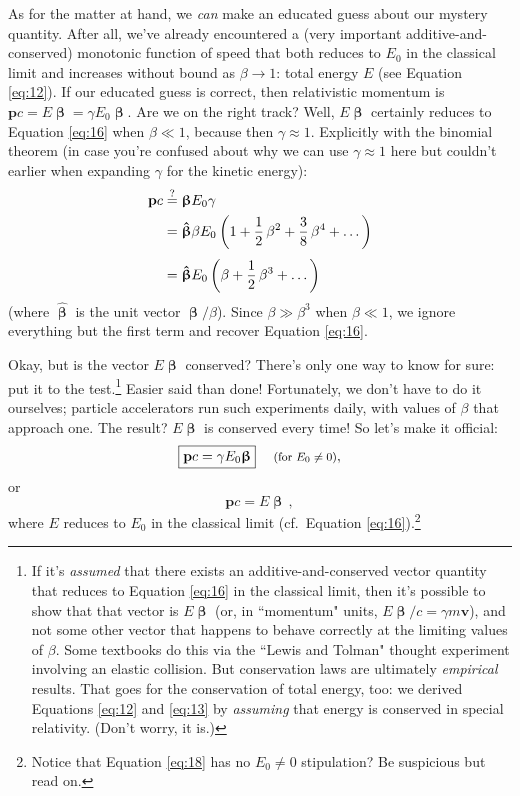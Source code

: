 \documentclass[12pt]{article}
\renewcommand{\vv}[1]{\mathbf{#1}}
\newcommand{\vvbeta}{\bm{\upbeta}}
\newcommand{\hatbeta}{\bm{\hat{\upbeta}}}
\begin{document}
As for the matter at hand, we \emph{can} make an educated guess about our mystery quantity. After all, we've already encountered a (very important additive-and-conserved) monotonic function of speed that both reduces to $E_0$ in the classical limit and increases without bound as $\beta \rightarrow 1$: total energy $E$ (see Equation \ref{eq:12}). If our educated guess is correct, then relativistic momentum is $\vv p c = E \vvbeta = \gamma E_0 \vvbeta$. Are we on the right track? Well, $E \vvbeta$ certainly reduces to Equation \ref{eq:16} when $\beta \ll 1$, because then $\gamma \approx 1$. Explicitly with the binomial theorem (in case you're confused about why we can use $\gamma \approx 1$ here but couldn't earlier when expanding $\gamma$ for the kinetic energy):
\begin{equation*}
\begin{split}
\vv p c &\stackrel{?}{=} \vvbeta E_0 \gamma \\
&=  \hatbeta \beta E_0 \mkern.5mu \left( 1 + \dfrac{1}{2} \, \beta ^2 +  \dfrac{3}{8} \, \beta ^4 + \dots \right) \\[3pt]
&=  \hatbeta E_0 \left( \beta + \dfrac{1}{2} \, \beta^3 + \dots \right)
\end{split}
\end{equation*}
(where $\hatbeta$ is the unit vector $\vvbeta / \beta$). Since $\beta \gg \beta^3$ when $\beta \ll 1$, we ignore everything but the first term and recover Equation \ref{eq:16}.

Okay, but is the vector $E \vvbeta$ conserved? There's only one way to know for sure: put it to the test.\footnote{If it's \emph{assumed} that there exists an additive-and-conserved vector quantity that reduces to Equation \ref{eq:16} in the classical limit, then it's possible to show that that vector is $E \vvbeta$ (or, in ``momentum" units, $E \vvbeta/c = \gamma m \vv v$), and not some other vector that happens to behave correctly at the limiting values of $\beta$. Some textbooks do this via the ``Lewis and Tolman" thought experiment involving an elastic collision. But conservation laws are ultimately \emph{empirical} results. That goes for the conservation of total energy, too: we derived Equations \ref{eq:12} and \ref{eq:13} by \emph{assuming} that energy is conserved in special relativity. (Don't worry, it is.)} Easier said than done! Fortunately, we don't have to do it ourselves; particle accelerators run such experiments daily, with values of $\beta$ that approach one. The result? $E \vvbeta$ is conserved every time! So let's make it official:
\begin{equation}\label{eq:17}
\boxed{\vv p c = \gamma E_0 \vvbeta}  \quad \textrm{\footnotesize{ (for $E_0 \neq 0$)}},
\end{equation}
or
\begin{equation}\label{eq:18}
\boxed{\vv p c = E \vvbeta} \, ,
\end{equation}
where $E$ reduces to $E_0$ in the classical limit (cf.\ Equation \ref{eq:16}).\footnote{Notice that Equation \ref{eq:18} has no $E_0 \neq 0$ stipulation? Be suspicious but read on.}
\end{document}
